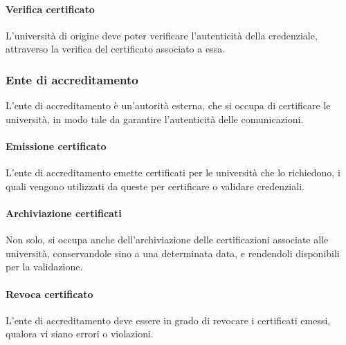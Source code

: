 \documentclass[a4paper,12pt]{article}
\begin{document}
\paragraph{Verifica certificato} L'università di origine deve poter verificare l'autenticità della credenziale, attraverso la verifica del certificato associato a essa.

\subsubsection{Ente di accreditamento}
L'ente di accreditamento è un'autorità esterna, che si occupa di certificare le università, in modo tale da garantire l'autenticità delle comunicazioni. 
\paragraph{Emissione certificato} L'ente di accreditamento emette certificati per le università che lo richiedono, i quali vengono utilizzati da queste per certificare o validare credenziali.
\paragraph{Archiviazione certificati} Non solo, si occupa anche dell'archiviazione delle certificazioni associate alle università, conservandole sino a una determinata data, e rendendoli disponibili per la validazione.
\paragraph{Revoca certificato} L'ente di accreditamento deve essere in grado di revocare i certificati emessi, qualora vi siano errori o violazioni.
\end{document}
